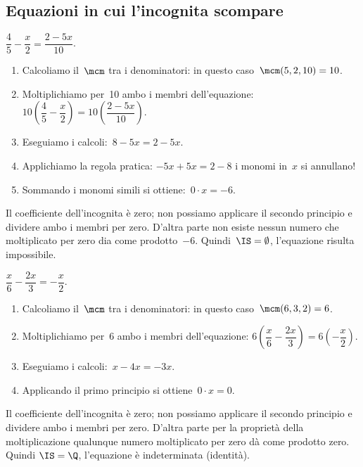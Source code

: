 

\subsection{Equazioni in cui l'incognita scompare}

 \begin{esempio}{}{}
 \(\dfrac{4}{5}-\dfrac{x}{2}=\dfrac{2-5x}{10}\).

 \begin{enumerate} [nosep]
  \item Calcoliamo il~\(\mcm\) tra i denominatori: in questo
caso~\(\mcm(5, 2, 10) = 10\).
  \item Moltiplichiamo per~10 ambo i membri
dell'equazione:
\(10\left(\dfrac{4}{5}-\dfrac{x}{2}\right)=10\left(\dfrac{2-5x}{10}\right)\).
  \item Eseguiamo i calcoli:~\(8-5x=2-5x\).
  \item Applichiamo la regola pratica:
\(-5x+5x=2-8\) i monomi in~\(x\) si annullano!
  \item Sommando i monomi simili si ottiene:~\(0\cdot x=-6\).
 \end{enumerate}

Il coefficiente dell'incognita è zero; non possiamo
applicare il secondo principio e dividere ambo i membri per zero.
D'altra parte non esiste nessun numero che moltiplicato
per zero dia come prodotto~\(-6\). Quindi~\(\IS =\emptyset \),
l'equazione risulta impossibile.
 \end{esempio}

 \begin{esempio}{}{}
\(\dfrac{x}{6}-\dfrac{2x}{3}=-{\dfrac{x}{2}}\).

\begin{enumerate} [nosep]
 \item Calcoliamo il~\(\mcm\) tra i denominatori: in questo
caso~\(\mcm(6, 3, 2) = 6\).
 \item Moltiplichiamo per~6 ambo i membri
dell'equazione:
\(6\left(\dfrac{x}{6}-\dfrac{2x}{3}\right)=6\left(-{\dfrac{x}{2}}\right)\).
 \item Eseguiamo i calcoli:~\(x-4x=-3x\).
 \item Applicando il primo principio si ottiene~\(0\cdot x=0\).
\end{enumerate}

Il coefficiente dell'incognita è zero; non possiamo
applicare il secondo principio e dividere ambo i membri per zero.
D'altra parte per la proprietà della moltiplicazione
qualunque numero moltiplicato per zero dà come prodotto zero. Quindi
\(\IS = \Q\), l'equazione è indeterminata (identità).
 \end{esempio}

